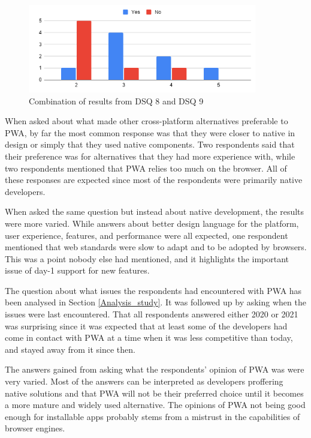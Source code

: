 \documentclass[a4paper,12pt]{article}
\begin{document}
\begin{figure}[ht!]
    \centering
    \includegraphics[width=10cm]{img/Analysis/know.png}
    \caption{Combination of results from DSQ 8 and DSQ 9 }
    \label{fig:analysis_know}
\end{figure}

When asked about what made other cross-platform alternatives preferable to PWA, by far the most common response was that they were closer to native in design or simply that they used native components. Two respondents said that their preference was for alternatives that they had more experience with, while two respondents mentioned that PWA relies too much on the browser. All of these responses are expected since most of the respondents were primarily native developers.

When asked the same question but instead about native development, the results were more varied. While answers about better design language for the platform, user experience, features, and performance were all expected, one respondent mentioned that web standards were slow to adapt and to be adopted by browsers. This was a point nobody else had mentioned, and it highlights the important issue of day-1 support for new features.

The question about what issues the respondents had encountered with PWA has been analysed in Section \ref{Analysis_study}. It was followed up by asking when the issues were last encountered. That all respondents answered either 2020 or 2021 was surprising since it was expected that at least some of the developers had come in contact with PWA at a time when it was less competitive than today, and stayed away from it since then.

The answers gained from asking what the respondents' opinion of PWA was were very varied. Most of the answers can be interpreted as developers proffering native solutions and that PWA will not be their preferred choice until it becomes a more mature and widely used alternative. The opinions of PWA not being good enough for installable apps probably stems from a mistrust in the capabilities of browser engines.
\end{document}
